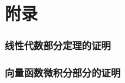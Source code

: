 \documentclass[zihao=-4,linespread=1.5,heading=true,a4paper,twoside]{ctexart}
\begin{document}




\newpage\part{附录}
\section{线性代数部分定理的证明}\label{sec:VI.1}


\section{向量函数微积分部分的证明}\label{sec:VI.2}
\end{document}
